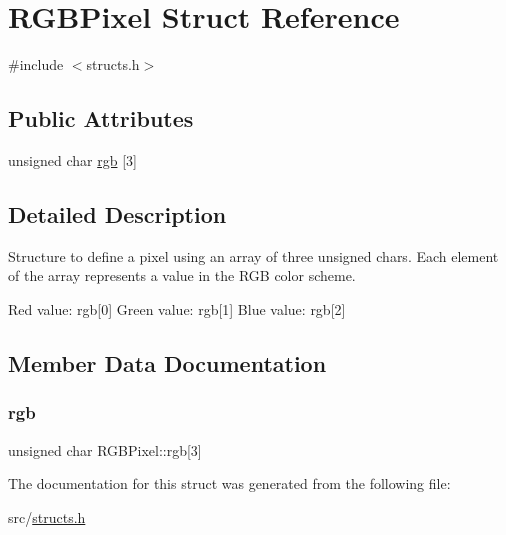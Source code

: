 \hypertarget{structRGBPixel}{}\section{R\+G\+B\+Pixel Struct Reference}
\label{structRGBPixel}


{\ttfamily \#include $<$structs.\+h$>$}

\subsection*{Public Attributes}
\begin{DoxyCompactItemize}
\item 
unsigned char \hyperlink{structRGBPixel_ab2885e04a6c08e167ffb5a5f341b430e}{rgb} \mbox{[}3\mbox{]}
\end{DoxyCompactItemize}


\subsection{Detailed Description}
Structure to define a pixel using an array of three unsigned chars. Each element of the array represents a value in the R\+GB color scheme.

Red value\+: rgb\mbox{[}0\mbox{]} Green value\+: rgb\mbox{[}1\mbox{]} Blue value\+: rgb\mbox{[}2\mbox{]} 

\subsection{Member Data Documentation}
\mbox{\label{structRGBPixel_ab2885e04a6c08e167ffb5a5f341b430e}} 
\subsubsection{\texorpdfstring{rgb}{rgb}}
{\footnotesize\ttfamily unsigned char R\+G\+B\+Pixel\+::rgb\mbox{[}3\mbox{]}}



The documentation for this struct was generated from the following file\+:\begin{DoxyCompactItemize}
\item 
src/\hyperlink{structs_8h}{structs.\+h}\end{DoxyCompactItemize}
